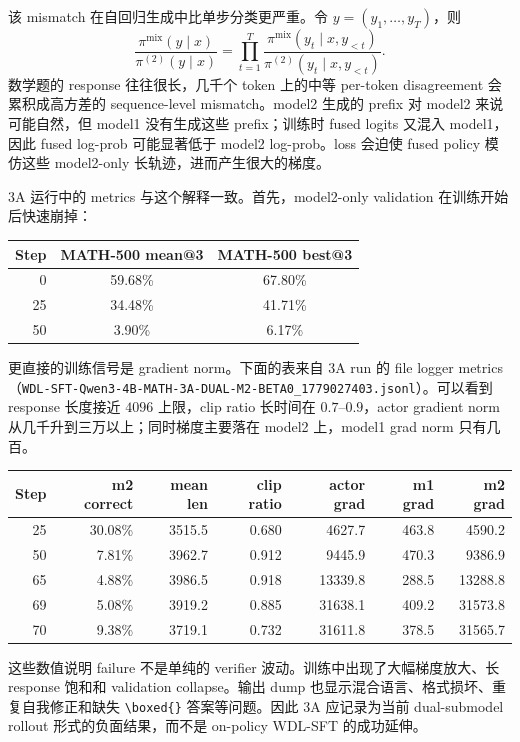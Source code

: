 该 mismatch 在自回归生成中比单步分类更严重。令 $y=(y_1,\ldots,y_T)$，则
\begin{equation}
    \frac{\pi^{\mathrm{mix}}(y\mid x)}{\pi^{(2)}(y\mid x)}
    =
    \prod_{t=1}^{T}
    \frac{
        \pi^{\mathrm{mix}}(y_t\mid x,y_{<t})
    }{
        \pi^{(2)}(y_t\mid x,y_{<t})
    }.
\end{equation}
数学题的 response 往往很长，几千个 token 上的中等 per-token disagreement 会累积成高方差的 sequence-level mismatch。model2 生成的 prefix 对 model2 来说可能自然，但 model1 没有生成这些 prefix；训练时 fused logits 又混入 model1，因此 fused log-prob 可能显著低于 model2 log-prob。loss 会迫使 fused policy 模仿这些 model2-only 长轨迹，进而产生很大的梯度。

3A 运行中的 metrics 与这个解释一致。首先，model2-only validation 在训练开始后快速崩掉：

\begin{center}
\small
\begin{tabular}{rcc}
\toprule
Step & MATH-500 mean@3 & MATH-500 best@3 \\
\midrule
0  & 59.68\% & 67.80\% \\
25 & 34.48\% & 41.71\% \\
50 & 3.90\%  & 6.17\% \\
\bottomrule
\end{tabular}
\end{center}

更直接的训练信号是 gradient norm。下面的表来自 3A run 的 file logger metrics（\texttt{WDL-SFT-Qwen3-4B-MATH-3A-DUAL-M2-BETA0\_1779027403.jsonl}）。可以看到 response 长度接近 $4096$ 上限，clip ratio 长时间在 $0.7$--$0.9$，actor gradient norm 从几千升到三万以上；同时梯度主要落在 model2 上，model1 grad norm 只有几百。

\begin{center}
\small
\begin{tabular}{rrrrrrr}
\toprule
Step & m2 correct & mean len & clip ratio & actor grad & m1 grad & m2 grad \\
\midrule
25 & 30.08\% & 3515.5 & 0.680 & 4627.7  & 463.8 & 4590.2 \\
50 & 7.81\%  & 3962.7 & 0.912 & 9445.9  & 470.3 & 9386.9 \\
65 & 4.88\%  & 3986.5 & 0.918 & 13339.8 & 288.5 & 13288.8 \\
69 & 5.08\%  & 3919.2 & 0.885 & 31638.1 & 409.2 & 31573.8 \\
70 & 9.38\%  & 3719.1 & 0.732 & 31611.8 & 378.5 & 31565.7 \\
\bottomrule
\end{tabular}
\end{center}

这些数值说明 failure 不是单纯的 verifier 波动。训练中出现了大幅梯度放大、长 response 饱和和 validation collapse。输出 dump 也显示混合语言、格式损坏、重复自我修正和缺失 \texttt{\textbackslash boxed\{\}} 答案等问题。因此 3A 应记录为当前 dual-submodel rollout 形式的负面结果，而不是 on-policy WDL-SFT 的成功延伸。
